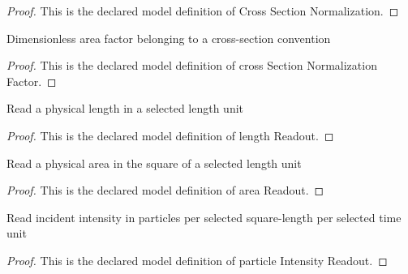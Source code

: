 \begin{proof}
  This is the declared model definition of Cross Section Normalization.
\end{proof}
\begin{definition}
  \label{def:physics:phyx-mini-0562:phyxminiproblems-problemphyxmini0562-crosssectionnormalizationfactor}
  Dimensionless area factor belonging to a cross-section convention
\end{definition}
\begin{proof}
  This is the declared model definition of cross Section Normalization Factor.
\end{proof}
\begin{definition}
  \label{def:physics:phyx-mini-0562:phyxminiproblems-problemphyxmini0562-lengthreadout}
  Read a physical length in a selected length unit
\end{definition}
\begin{proof}
  This is the declared model definition of length Readout.
\end{proof}
\begin{definition}
  \label{def:physics:phyx-mini-0562:phyxminiproblems-problemphyxmini0562-areareadout}
  Read a physical area in the square of a selected length unit
\end{definition}
\begin{proof}
  This is the declared model definition of area Readout.
\end{proof}
\begin{definition}
  \label{def:physics:phyx-mini-0562:phyxminiproblems-problemphyxmini0562-particleintensityreadout}
  Read incident intensity in particles per selected square-length per selected time unit
\end{definition}
\begin{proof}
  This is the declared model definition of particle Intensity Readout.
\end{proof}
